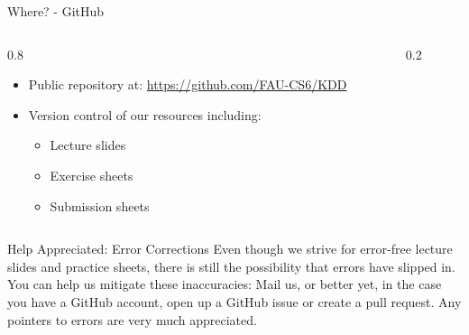 \begin{frame}{Where? - GitHub}
	\begin{columns}
		\begin{column}{0.8\textwidth}
			\begin{itemize}
				\item Public repository at: \url{https://github.com/FAU-CS6/KDD}
				\item Version control of our resources including:
				      \begin{itemize}
					      \item Lecture slides
					      \item Exercise sheets
					      \item Submission sheets
				      \end{itemize}
			\end{itemize}
		\end{column}
		\begin{column}{0.2\textwidth}
			\begin{center}
			\end{center}
		\end{column}
	\end{columns}
	\vspace{5mm}
	\begin{exampleblock}{Help Appreciated: Error Corrections}
		Even though we strive for error-free lecture slides and practice sheets, there is still the possibility  that errors have slipped in. You can help us mitigate these inaccuracies: Mail us, or better yet, in the case you have a GitHub account, open up a GitHub issue or create a pull request. Any pointers to errors are very much appreciated.
	\end{exampleblock}

\end{frame}
